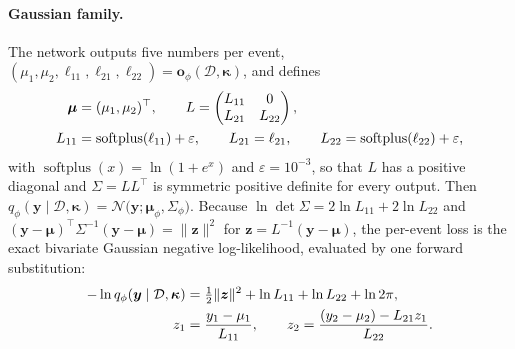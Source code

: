 \documentclass[11pt]{article}
\theoremstyle{definition}
\newcommand{\D}{\mathcal{D}}
\newcommand{\y}{\bm{y}}
\newcommand{\N}{\mathcal{N}}
\DeclareMathOperator{\softplus}{softplus}
\begin{document}
\paragraph{Gaussian family.}
The network outputs five numbers per event, $(\mu_1,\mu_2,\ell_{11},\ell_{21},\ell_{22})=\bm o_\phi(\D,\bm\kappa)$, and defines
\begin{align}
  \bm\mu &= (\mu_1,\mu_2)^\top,\qquad
  L = \begin{pmatrix} L_{11} & 0\\ L_{21} & L_{22}\end{pmatrix}, \label{eq:head}\\
  L_{11} &= \softplus(\ell_{11})+\varepsilon,\qquad L_{21}=\ell_{21},\qquad L_{22}=\softplus(\ell_{22})+\varepsilon, \notag
\end{align}
with $\softplus(x)=\ln(1+e^x)$ and $\varepsilon=10^{-3}$, so that $L$ has a positive diagonal and
$\Sigma=LL^\top$ is symmetric positive definite for every output. Then
$q_\phi(\y\mid\D,\bm\kappa)=\N\big(\y;\bm\mu_\phi,\Sigma_\phi\big)$. Because $\ln\det\Sigma = 2\ln L_{11}+2\ln L_{22}$
and $(\y-\bm\mu)^\top\Sigma^{-1}(\y-\bm\mu)=\|\bm z\|^2$ for $\bm z=L^{-1}(\y-\bm\mu)$, the per-event loss is the
exact bivariate Gaussian negative log-likelihood, evaluated by one forward substitution:
\begin{align}
  -\ln q_\phi(\y\mid\D,\bm\kappa) &= \tfrac12\|\bm z\|^2 + \ln L_{11} + \ln L_{22} + \ln 2\pi, \label{eq:nll}\\
  z_1 &= \frac{y_1-\mu_1}{L_{11}},\qquad z_2 = \frac{(y_2-\mu_2) - L_{21}z_1}{L_{22}} . \notag
\end{align}
\end{document}
